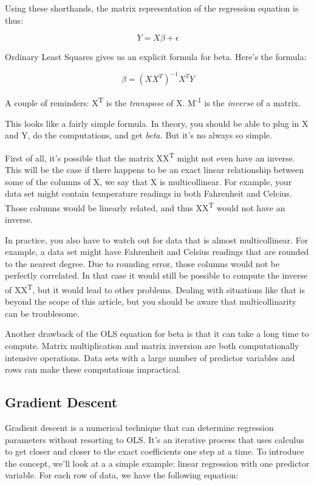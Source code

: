 \documentclass[11pt]{article}
\begin{document}
Using these shorthands, the matrix representation of the regression equation is thus:

$$
Y = X \beta + \epsilon
$$

Ordinary Least Squares gives us an explicit formula for beta. Here's the formula:

$$
\beta = (XX^T)^{-1} X^TY
$$

A couple of reminders: X\textsuperscript{T} is the \emph{transpose} of X. M\textsuperscript{-1} is the \emph{inverse} of a matrix.

This looks like a fairly simple formula. In theory, you should be able to plug in X and Y, do the computations, and get \emph{beta.} But it's no always so simple.

First of all, it's possible that the matrix XX\textsuperscript{T} might not even have an inverse. This will be the case if there happens to be an exact linear relationship between some of the columns of X, we say that X is multicollinear. For example, your data set might contain temperature readings in both Fahrenheit and Celcius. Those columns would be linearly related, and thus XX\textsuperscript{T} would not have an inverse.

In practice, you also have to watch out for data that is almost multicollinear. For example, a data set might have Fahrenheit and Celsius readings that are rounded to the nearest degree. Due to rounding error, those columns would not be perfectly correlated. In that case it would still be possible to compute the inverse of XX\textsuperscript{T}, but it would lead to other problems. Dealing with situations like that is beyond the scope of this article, but you should be aware that multicollinarity can be troublesome.

Another drawback of the OLS equation for beta is that it can take a long time to compute. Matrix multiplication and matrix inversion are both computationally intensive operations. Data sets with a large number of predictor variables and rows can make these computations impractical.

\subsection{Gradient Descent}
\label{sec:org72c71bd}
Gradient descent is a numerical technique that can determine regression parameters without resorting to OLS. It's an iterative process that uses calculus to get closer and closer to the exact coefficients one step at a time. To introduce the concept, we'll look at a a simple example: linear regression with one predictor variable. For each row of data, we have the following equation:
\end{document}
